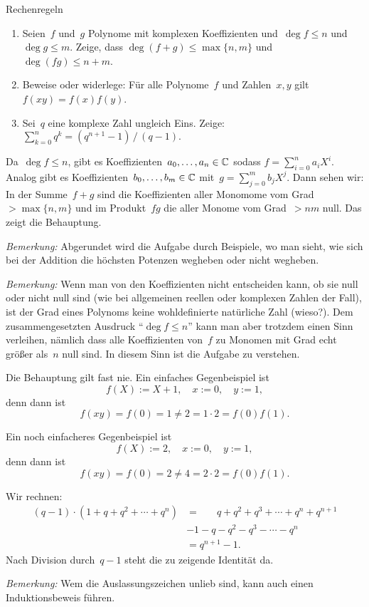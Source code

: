 \documentclass{algblatt}
\begin{document}
\begin{aufgabe}{Rechenregeln}
\begin{enumerate}
\item Seien~$f$ und~$g$ Polynome mit komplexen Koeffizienten und~$\deg f \leq
n$ und~$\deg g \leq m$.
Zeige, dass $\deg(f+g) \leq \max\{n,m\}$ und~$\deg(fg) \leq n+m$.
\item Beweise oder widerlege: Für alle Polynome~$f$ und Zahlen~$x,y$ gilt~$f(xy) = f(x) f(y)$.
\item Sei~$q$ eine komplexe Zahl ungleich Eins. Zeige: $\sum_{k=0}^n q^k =
(q^{n+1}-1)\,/\,(q-1).$
\end{enumerate}
\begin{loesungE}
\item Da~$\deg f \leq n$, gibt es Koeffizienten~$a_0,\ldots,a_n \in \mathbb{C}$
sodass $f = \sum_{i=0}^n a_i X^i$. Analog gibt es Koeffizienten~$b_0,\ldots,b_m
\in \mathbb{C}$ mit~$g = \sum_{j=0}^m b_j X^j$. Dann sehen wir: In der Summe~$f+g$
sind die Koeffizienten aller Monomome vom Grad~$> \max\{n,m\}$ und im
Produkt~$fg$ die aller Monome vom Grad~$> nm$ null. Das zeigt die Behauptung.

\emph{Bemerkung:} Abgerundet wird die Aufgabe durch Beispiele, wo man sieht,
wie sich bei der Addition die höchsten Potenzen wegheben oder nicht wegheben.

\emph{Bemerkung:} Wenn man von den Koeffizienten nicht entscheiden kann, ob sie
null oder nicht null sind (wie bei allgemeinen reellen oder komplexen Zahlen
der Fall), ist der Grad eines Polynoms keine wohldefinierte natürliche Zahl
(wieso?). Dem zusammengesetzten Ausdruck "`$\deg f \leq n$"' kann man aber
trotzdem einen Sinn verleihen, nämlich dass alle Koeffizienten von~$f$ zu
Monomen mit Grad echt größer als~$n$ null sind. In diesem Sinn ist die Aufgabe
zu verstehen.

\item Die Behauptung gilt fast nie. Ein einfaches Gegenbeispiel ist
\[ f(X) := X + 1, \quad x := 0, \quad y := 1, \]
denn dann ist
\[ f(xy) = f(0) = 1 \neq 2 = 1 \cdot 2 = f(0) f(1). \]

Ein noch einfacheres Gegenbeispiel ist
\[ f(X) := 2, \quad x := 0, \quad y := 1, \]
denn dann ist
\[ f(xy) = f(0) = 2 \neq 4 = 2 \cdot 2 = f(0) f(1). \]

\item Wir rechnen:
\begin{align*}
  (q-1) \cdot (1 + q + q^2 + \cdots + q^n) &=
    \phantom{1\mathop{-}{}} q + q^2 + q^3 + \cdots + q^n + q^{n+1} \\
  &-1 - q - q^2 - q^3 - \cdots - q^n \\
  &= q^{n+1} - 1.
\end{align*}
Nach Division durch~$q-1$ steht die zu zeigende Identität da.

\emph{Bemerkung:} Wem die Auslassungszeichen unlieb sind, kann auch einen
Induktionsbeweis führen.
\end{loesungE}
\end{aufgabe}
\end{document}
